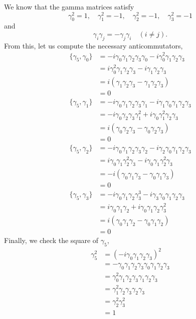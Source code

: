 \documentclass[../road-to-reality.tex]{subfiles}
\begin{document}
\begin{questions}
		\begin{solution}
			We know that the gamma matrices satisfy
			\[
				\gamma_0^2 = 1,\quad\gamma_1^2 = -1,\quad\gamma_2^2 = -1,\quad\gamma_3^2 = -1
			\]
			and
			\[
				\gamma_i\gamma_j = -\gamma_j\gamma_i\quad(i\neq j).
			\]
			From this, let us compute the necessary anticommutators,
			\begin{align*}
				\{\gamma_5, \gamma_0\} &= -i\gamma_0\gamma_1\gamma_2\gamma_3\gamma_0 - i\gamma_0^2\gamma_1\gamma_2\gamma_3 \\
				&= i\gamma_0^2\gamma_1\gamma_2\gamma_3 - i\gamma_1\gamma_2\gamma_3 \\
				&= i(\gamma_1\gamma_2\gamma_3 - \gamma_1\gamma_2\gamma_3) \\
				&= 0 \\
				\{\gamma_5, \gamma_1\} &= -i\gamma_0\gamma_1\gamma_2\gamma_3\gamma_1 - i\gamma_1\gamma_0\gamma_1\gamma_2\gamma_3 \\
				&= -i\gamma_0\gamma_2\gamma_3\gamma_1^2 + i \gamma_0\gamma_1^2\gamma_2\gamma_3 \\
				&= i(\gamma_0\gamma_2\gamma_3 - \gamma_0\gamma_2\gamma_3) \\
				&= 0 \\
				\{\gamma_5, \gamma_2\} &= -i\gamma_0\gamma_1\gamma_2\gamma_3\gamma_2 - i\gamma_2\gamma_0\gamma_1\gamma_2\gamma_3 \\
				&= i\gamma_0\gamma_1\gamma_2^2\gamma_3 - i\gamma_0\gamma_1\gamma_2^2\gamma_3 \\
				&= -i(\gamma_0\gamma_1\gamma_3 - \gamma_0\gamma_1\gamma_3) \\
				&= 0 \\
				\{\gamma_5, \gamma_3\} &= -i\gamma_0\gamma_1\gamma_2\gamma_3^3 - i\gamma_3\gamma_0\gamma_1\gamma_2\gamma_3 \\
				&= i\gamma_0\gamma_1\gamma_2 + i\gamma_0\gamma_1\gamma_2\gamma_3^2 \\
				&= i(\gamma_0\gamma_1\gamma_2 - \gamma_0\gamma_1\gamma_2) \\
				&= 0
			\end{align*}
			Finally, we check the square of $\gamma_5$,
			\begin{align*}
				\gamma_5^2 &= (-i\gamma_0\gamma_1\gamma_2\gamma_3)^2 \\
				&= -\gamma_0\gamma_1\gamma_2\gamma_3\gamma_0\gamma_1\gamma_2\gamma_3 \\
				&= \gamma_0^2\gamma_1\gamma_2\gamma_3\gamma_1\gamma_2\gamma_3 \\
				&= \gamma_1^2\gamma_2\gamma_3\gamma_2\gamma_3 \\
				&= \gamma_2^2\gamma_3^2 \\
				&= 1
			\end{align*}
		\end{solution}
		

\end{questions}
\end{document}
